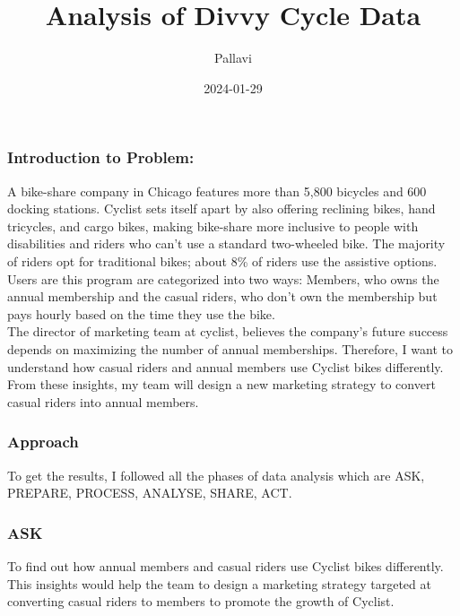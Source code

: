 \documentclass[
]{article}
\title{Analysis of Divvy Cycle Data}
\author{Pallavi}
\date{2024-01-29}
\begin{document}
\maketitle

\hypertarget{introduction-to-problem}{%
\subsubsection{Introduction to Problem:}\label{introduction-to-problem}}

A bike-share company in Chicago features more than 5,800 bicycles and
600 docking stations. Cyclist sets itself apart by also offering
reclining bikes, hand tricycles, and cargo bikes, making bike-share more
inclusive to people with disabilities and riders who can't use a
standard two-wheeled bike. The majority of riders opt for traditional
bikes; about 8\% of riders use the assistive options. Users are this
program are categorized into two ways: Members, who owns the annual
membership and the casual riders, who don't own the membership but pays
hourly based on the time they use the bike.\\

The director of marketing team at cyclist, believes the company's future
success depends on maximizing the number of annual memberships.
Therefore, I want to understand how casual riders and annual members use
Cyclist bikes differently. From these insights, my team will design a
new marketing strategy to convert casual riders into annual members.\\

\hypertarget{approach}{%
\subsubsection{Approach}\label{approach}}

To get the results, I followed all the phases of data analysis which are
ASK, PREPARE, PROCESS, ANALYSE, SHARE, ACT.\\

\hypertarget{ask}{%
\subsubsection{ASK}\label{ask}}

To find out how annual members and casual riders use Cyclist bikes
differently. This insights would help the team to design a marketing
strategy targeted at converting casual riders to members to promote the
growth of Cyclist.
\end{document}
